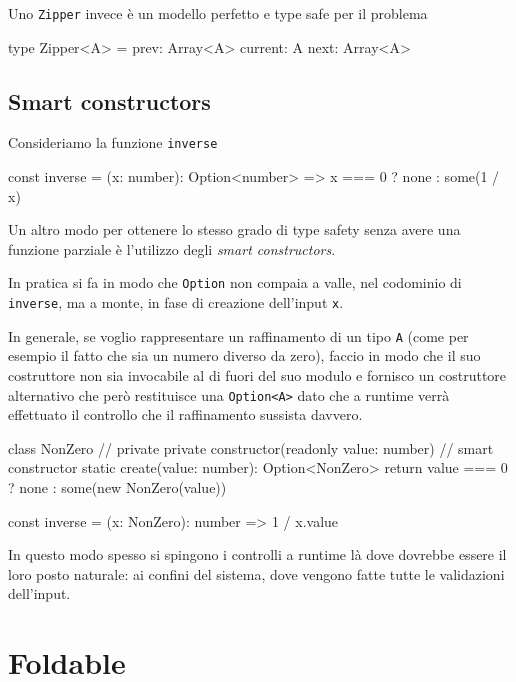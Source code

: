 \documentclass[12pt]{article}
\theoremstyle{definition}
\newenvironment{code}
  {\vspace{0.5cm} \VerbatimEnvironment\begin{typescriptcode}}
  {\end{typescriptcode} \vspace{0.2cm}}
\begin{document}
Uno \texttt{Zipper} invece è un modello perfetto e type safe per il problema

\begin{code}
type Zipper<A> = {
  prev: Array<A>
  current: A
  next: Array<A>
}
\end{code}

\subsection{Smart constructors}

Consideriamo la funzione \texttt{inverse}

\begin{code}
const inverse = (x: number): Option<number> =>
  x === 0 ? none : some(1 / x)
\end{code}

Un altro modo per ottenere lo stesso grado di type safety senza avere una funzione parziale è l'utilizzo degli \emph{smart constructors}.

In pratica si fa in modo che \texttt{Option} non compaia a valle, nel codominio di \texttt{inverse},
ma a monte, in fase di creazione dell'input \texttt{x}.

In generale, se voglio rappresentare un raffinamento di un tipo \texttt{A} (come per esempio il fatto che sia un numero diverso da zero),
faccio in modo che il suo costruttore non sia invocabile al di fuori del suo modulo e fornisco un costruttore alternativo
che però restituisce una \texttt{Option<A>} dato che a runtime verrà effettuato il controllo che il raffinamento sussista davvero.

\begin{code}
class NonZero {
  // private
  private constructor(readonly value: number) {}
  // smart constructor
  static create(value: number): Option<NonZero> {
    return value === 0 ? none : some(new NonZero(value))
  }
}

const inverse = (x: NonZero): number => 1 / x.value
\end{code}

In questo modo spesso si spingono i controlli a runtime là dove dovrebbe essere il loro posto naturale: ai confini del sistema,
dove vengono fatte tutte le validazioni dell'input.

\newpage

\section{Foldable}
\end{document}
